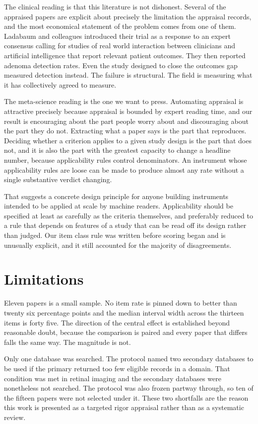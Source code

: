 \documentclass{article}
\begin{document}
The clinical reading is that this literature is not dishonest. Several of the appraised papers are
explicit about precisely the limitation the appraisal records, and the most economical statement of
the problem comes from one of them. Ladabaum and colleagues \cite{ladabaum2023} introduced their
trial as a response to an expert consensus calling for studies of real world interaction between
clinicians and artificial intelligence that report relevant patient outcomes. They then reported
adenoma detection rates.
Even the study designed to close the outcomes gap measured detection instead. The failure is
structural. The field is measuring what it has collectively agreed to measure.

The meta-science reading is the one we want to press. Automating appraisal is attractive precisely
because appraisal is bounded by expert reading time, and our result is encouraging about the part
people worry about and discouraging about the part they do not. Extracting what a paper says is the
part that reproduces. Deciding whether a criterion applies to a given study design is the part that
does not, and it is also the part with the greatest capacity to change a headline number, because
applicability rules control denominators. An instrument whose applicability rules are loose can be
made to produce almost any rate without a single substantive verdict changing.

That suggests a concrete design principle for anyone building instruments intended to be applied at
scale by machine readers. Applicability should be specified at least as carefully as the criteria
themselves, and preferably reduced to a rule that depends on features of a study that can be read
off its design rather than judged. Our item class rule was written before scoring began and is
unusually explicit, and it still accounted for the majority of disagreements.

\section{Limitations}
\label{sec:limitations}

Eleven papers is a small sample. No item rate is pinned down to better than twenty six percentage
points and the median interval width across the thirteen items is forty five. The direction of the
central effect is established beyond reasonable doubt, because the comparison is paired and every
paper that differs falls the same way. The magnitude is not.

Only one database was searched. The protocol named two secondary databases to be used if the primary
returned too few eligible records in a domain. That condition was met in retinal imaging and the
secondary databases were nonetheless not searched. The protocol was also frozen partway through, so
ten of the fifteen papers were not selected under it. These two shortfalls are the reason this work
is presented as a targeted rigor appraisal rather than as a systematic review.
\end{document}
